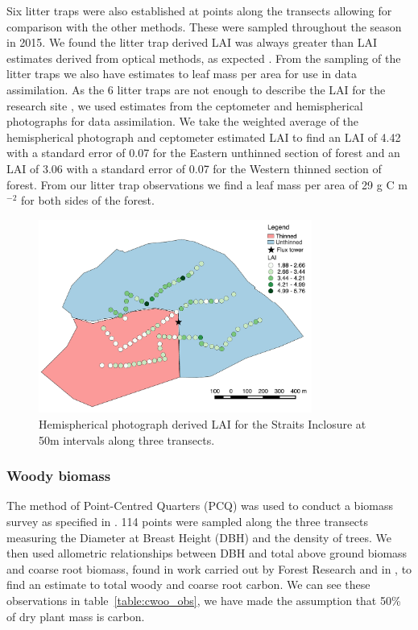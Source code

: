 \documentclass[11pt]{article}
\begin{document}
Six litter traps were also established at points along the transects allowing for comparison with the other methods. These were sampled throughout the season in 2015. We found the litter trap derived LAI was always greater than LAI estimates derived from optical methods, as expected \citep{breda2003ground}. From the sampling of the litter traps we also have estimates to leaf mass per area for use in data assimilation. As the 6 litter traps are not enough to describe the LAI for the research site \citep{kimmins1973some}, we used estimates from the ceptometer and hemispherical photographs for data assimilation. We take the weighted average of the hemispherical photograph and ceptometer estimated LAI to find an LAI of 4.42 with a standard error of 0.07 for the Eastern unthinned section of forest and an LAI of 3.06 with a standard error of 0.07 for the Western thinned section of forest. From our litter trap observations we find a leaf mass per area of 29 g C m\(^{-2}\) for both sides of the forest.


\begin{figure}[ht]
    \centering
    \includegraphics[width=0.8\textwidth]{thinned.pdf}
    \caption{Hemispherical photograph derived LAI for the Straits Inclosure at 50m intervals along three transects.} \label{fig:hemi_lai}
\end{figure}

\subsubsection{Woody biomass}  
The method of Point-Centred Quarters (PCQ) was used to conduct a biomass survey as specified in \citet{dahdouh2006empirical}. 114 points were sampled along the three transects measuring the Diameter at Breast Height (DBH) and the density of trees. We then used allometric relationships between DBH and total above ground biomass and coarse root biomass, found in work carried out by Forest Research and in \citet{mckay2003woodfuel}, to find an estimate to total woody and coarse root carbon. We can see these observations in table~\ref{table:cwoo_obs}, we have made the assumption that 50\% of dry plant mass is carbon.
\end{document}
